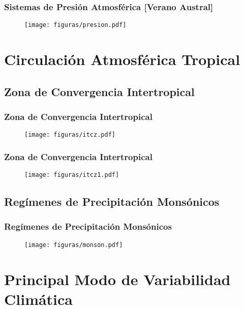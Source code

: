 \documentclass{beamer}
\newtheorem{Th1}{Reseña Historica}
\begin{document}
\begin{frame}
\frametitle{Sistemas de Presión Atmosférica [Verano Austral]}
\begin{figure}[!hbt]
   \centering
   \texttt{[image: figuras/presion.pdf]}
\end{figure}
\end{frame} 

\section{Circulación Atmosférica Tropical}
\subsection{Zona de Convergencia Intertropical}
\begin{frame}
\frametitle{Zona de Convergencia Intertropical}
\begin{figure}[!hbt]
   \centering
   \texttt{[image: figuras/itcz.pdf]}
\end{figure}
\end{frame} 

\begin{frame}
\frametitle{Zona de Convergencia Intertropical}
\begin{figure}[!hbt]
   \centering
   \texttt{[image: figuras/itcz1.pdf]}
\end{figure}
\end{frame}

\subsection{Regímenes de Precipitación Monsónicos}
\begin{frame}
\frametitle{Regímenes de Precipitación Monsónicos}
\begin{figure}[!hbt]
   \centering
   \texttt{[image: figuras/monson.pdf]}
\end{figure}
\end{frame}

\section{Principal Modo de Variabilidad Climática}
\end{document}
